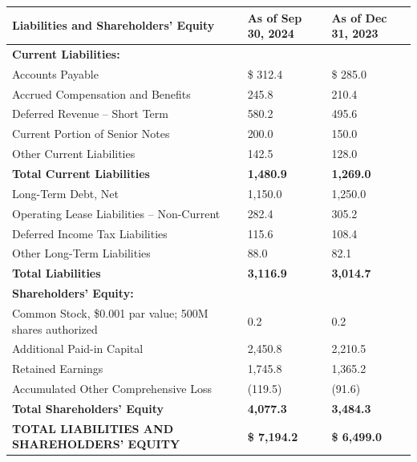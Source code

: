 \documentclass[10pt,a4paper]{article}
\begin{document}
\vspace{4pt}
\begin{tabularx}{\textwidth}{K M M}
\toprule
{}
\color{white}\bfseries Liabilities and Shareholders' Equity & \color{white}\bfseries As of Sep 30, 2024 & \color{white}\bfseries As of Dec 31, 2023 \\
\midrule
\textbf{Current Liabilities:} & & \\{}
\quad Accounts Payable & \$ 312.4 & \$ 285.0 \\{}
\quad Accrued Compensation and Benefits & 245.8 & 210.4 \\{}
\quad Deferred Revenue -- Short Term & 580.2 & 495.6 \\{}
\quad Current Portion of Senior Notes & 200.0 & 150.0 \\{}
\quad Other Current Liabilities & 142.5 & 128.0 \\
\cmidrule(lr){2-3}
\quad \textbf{Total Current Liabilities} & \textbf{1,480.9} & \textbf{1,269.0} \\{}
Long-Term Debt, Net & 1,150.0 & 1,250.0 \\{}
Operating Lease Liabilities -- Non-Current & 282.4 & 305.2 \\{}
Deferred Income Tax Liabilities & 115.6 & 108.4 \\{}
Other Long-Term Liabilities & 88.0 & 82.1 \\
\midrule
\textbf{Total Liabilities} & \textbf{3,116.9} & \textbf{3,014.7} \\
\midrule
\textbf{Shareholders' Equity:} & & \\{}
\quad Common Stock, \$0.001 par value; 500M shares authorized & 0.2 & 0.2 \\{}
\quad Additional Paid-in Capital & 2,450.8 & 2,210.5 \\{}
\quad Retained Earnings & 1,745.8 & 1,365.2 \\{}
\quad Accumulated Other Comprehensive Loss & (119.5) & (91.6) \\
\cmidrule(lr){2-3}
\quad \textbf{Total Shareholders' Equity} & \textbf{4,077.3} & \textbf{3,484.3} \\
\midrule
\textbf{TOTAL LIABILITIES AND SHAREHOLDERS' EQUITY} & \textbf{\$ 7,194.2} & \textbf{\$ 6,499.0} \\
\bottomrule
\end{tabularx}

\clearpage

\end{document}
